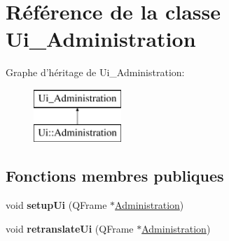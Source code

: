 \hypertarget{class_ui___administration}{\section{Référence de la classe Ui\+\_\+\+Administration}
\label{class_ui___administration}
}
Graphe d'héritage de Ui\+\_\+\+Administration\+:\begin{figure}[H]
\begin{center}
\leavevmode
\includegraphics[height=2.000000cm]{class_ui___administration}
\end{center}
\end{figure}
\subsection*{Fonctions membres publiques}
\begin{DoxyCompactItemize}
\item 
\hypertarget{class_ui___administration_aed0321283112227dbfa74f4ba4870dc8}{void {\bfseries setup\+Ui} (Q\+Frame $\ast$\hyperlink{class_administration}{Administration})}\label{class_ui___administration_aed0321283112227dbfa74f4ba4870dc8}

\item 
\hypertarget{class_ui___administration_aef9aaf56620fbb3d0111a998c62e8558}{void {\bfseries retranslate\+Ui} (Q\+Frame $\ast$\hyperlink{class_administration}{Administration})}\label{class_ui___administration_aef9aaf56620fbb3d0111a998c62e8558}

\end{DoxyCompactItemize}
